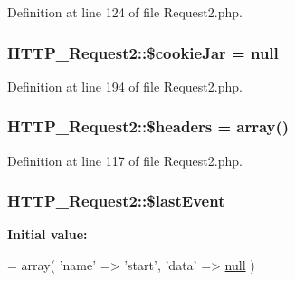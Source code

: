 Definition at line 124 of file Request2.\+php.

\subsubsection[{\texorpdfstring{\$cookie\+Jar}{$cookieJar}}]{\setlength{\rightskip}{0pt plus 5cm}H\+T\+T\+P\+\_\+\+Request2\+::\$cookie\+Jar = {\bf null}\hspace{0.3cm}{\ttfamily [protected]}}\hypertarget{classHTTP__Request2_a1a4f35074ef955bfe726e85b76ed17a9}{}\label{classHTTP__Request2_a1a4f35074ef955bfe726e85b76ed17a9}


Definition at line 194 of file Request2.\+php.

\subsubsection[{\texorpdfstring{\$headers}{$headers}}]{\setlength{\rightskip}{0pt plus 5cm}H\+T\+T\+P\+\_\+\+Request2\+::\$headers = array()\hspace{0.3cm}{\ttfamily [protected]}}\hypertarget{classHTTP__Request2_a0d70f1b39d77f1e8bca7cd984d25192e}{}\label{classHTTP__Request2_a0d70f1b39d77f1e8bca7cd984d25192e}


Definition at line 117 of file Request2.\+php.

\subsubsection[{\texorpdfstring{\$last\+Event}{$lastEvent}}]{\setlength{\rightskip}{0pt plus 5cm}H\+T\+T\+P\+\_\+\+Request2\+::\$last\+Event\hspace{0.3cm}{\ttfamily [protected]}}\hypertarget{classHTTP__Request2_a53a051d2cfcad3fc688b7974c996e750}{}\label{classHTTP__Request2_a53a051d2cfcad3fc688b7974c996e750}
{\bfseries Initial value\+:}
\begin{DoxyCode}
= array(
        \textcolor{stringliteral}{'name'} => \textcolor{stringliteral}{'start'},
        \textcolor{stringliteral}{'data'} => \hyperlink{modernizr_8min_8js_a286f9ec831c5e676eeb493248eab9575}{null}
    )
\end{DoxyCode}


